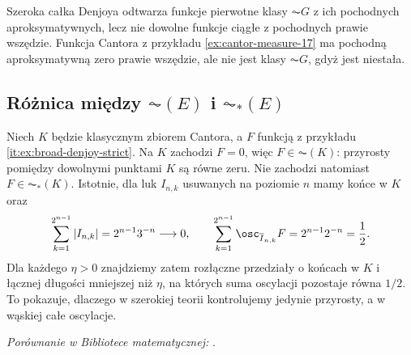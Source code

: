 \begin{uwaga}
Szeroka całka Denjoya odtwarza funkcje pierwotne klasy $\AC G$ z ich pochodnych aproksymatywnych, lecz nie dowolne funkcje ciągłe z pochodnych prawie wszędzie. Funkcja Cantora z przykładu \ref{ex:cantor-measure-17} ma pochodną aproksymatywną zero prawie wszędzie, ale nie jest klasy $\AC G$, gdyż jest niestała.
\end{uwaga}

\subsection*{Różnica między $\AC(E)$ i $\AC_*(E)$}
\begin{przyklad}\label{prz:ac-kontra-acstar}
Niech $K$ będzie klasycznym zbiorem Cantora, a $F$ funkcją z przykładu \ref{it:ex:broad-denjoy-strict}. Na $K$ zachodzi $F=0$, więc $F\in\AC(K)$: przyrosty pomiędzy dowolnymi punktami $K$ są równe zeru. Nie zachodzi natomiast $F\in\AC_*(K)$. Istotnie, dla luk $I_{n,k}$ usuwanych na poziomie $n$ mamy końce w $K$ oraz
\[
\sum_{k=1}^{2^{n-1}}|I_{n,k}|=2^{n-1}3^{-n}\longrightarrow0,
\qquad
\sum_{k=1}^{2^{n-1}}\osc_{\overline I_{n,k}}F
=2^{n-1}2^{-n}=\frac12.
\]
Dla każdego $\eta>0$ znajdziemy zatem rozłączne przedziały o końcach w $K$ i łącznej długości mniejszej niż $\eta$, na których suma oscylacji pozostaje równa $1/2$. To pokazuje, dlaczego w szerokiej teorii kontrolujemy jedynie przyrosty, a w wąskiej całe oscylacje.
\end{przyklad}
\noindent\emph{Porównanie w Bibliotece matematycznej:} .

